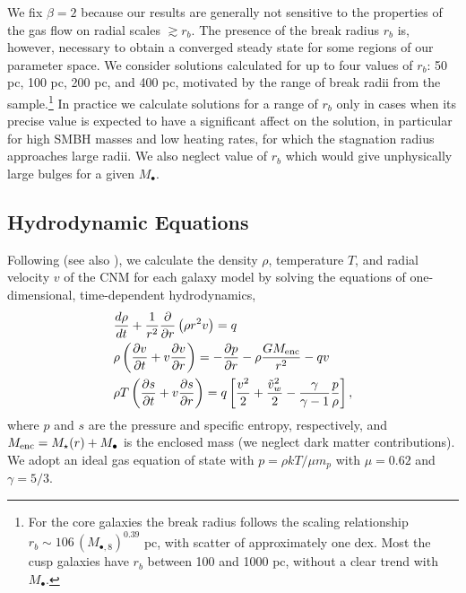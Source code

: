 \documentclass[usenatbib,fleqn]{mn2e}
\newcommand{\rb}{r_b}
\newcommand{\dxdy}[2]{\frac{d #1}{d #2} }
\newcommand{\drhodt}{\dxdy{\rho}{t}}
\newcommand{\ke}{\frac{v^2}{2}}
\newcommand{\kew}{\frac{\tilde{v}_{w}^2}{2}}
\newcommand{\gammaf}{\frac{\gamma}{\gamma-1}}
\newcommand{\cs}{\frac{p}{\rho}}
\newcommand{\Mbh}[1][]{M_{\bullet#1}}
\newcommand{\Mbheight}{M_{\bullet,8}}
\begin{document}
We fix $\beta = 2$ because our results are
generally not sensitive to the properties of the gas flow on radial
scales $\gtrsim r_b$. The presence of the break radius $r_{b}$ is,
however, necessary to obtain a converged steady state for some regions
of our parameter space.  We consider solutions calculated for up to
four values of $\rb$: 50 pc, 100 pc, 200 pc, and 400 pc, motivated by
the range of break radii from the \citet{LauerFaber+:2007a}
sample.\footnote{For the core galaxies the break radius follows the
  scaling relationship $\rb\sim 106 \, (\Mbheight)^{0.39}$ pc, with
  scatter of approximately one dex.  Most the cusp galaxies have $\rb$
  between 100 and 1000 pc, without a clear trend with $\Mbh$.}  In
practice we calculate solutions for a range of $\rb$ only in cases
when its precise value is expected to have a significant affect on the
solution, in particular for high SMBH masses and low heating rates,
for which the stagnation radius approaches large radii. We also
neglect value of $r_b$ which would give unphysically large bulges for
a given $\Mbh$.


\subsection{Hydrodynamic Equations}
\label{sec:hydro}

Following \citet{Quataert:2004a} (see also
\citealt{HolzerAxford:1970a,De-ColleGuillochon+:2012a,ShcherbakovWong+:2014a}),
we calculate the density $\rho$, temperature $T$, and radial velocity
$v$ of the CNM for each galaxy model by solving the equations of
one-dimensional, time-dependent hydrodynamics,
\begin{align}
  &\drhodt+\frac{1}{r^2}\frac{\partial}{\partial r}\left(\rho r^2 v\right)=q \label{eq:drhodt}\\
  &\rho \left(\frac{\partial v}{\partial t} + v\frac{\partial
      v}{\partial r}\right) =-\frac{\partial p}{\partial r}- \rho\frac{GM_{\rm enc}}{r^{2}} -q v \label{eq:dvdt}\\
  &\rho T\left(\frac{\partial s}{\partial t} + v\frac{\partial
      s}{\partial r}\right)=q\left[\ke+\kew-\gammaf \cs \right] 
, 
\label{eq:dsdt}
\end{align}
where $p$ and $s$ are the pressure and specific entropy, respectively, and $M_{\rm enc} = M_{\star}(r) + \Mbh$ is the
enclosed mass (we neglect dark matter contributions).  We adopt an ideal gas equation of state with $p = \rho kT/\mu m_p$ with $\mu = 0.62$  and $\gamma = 5/3$. 
\end{document}

